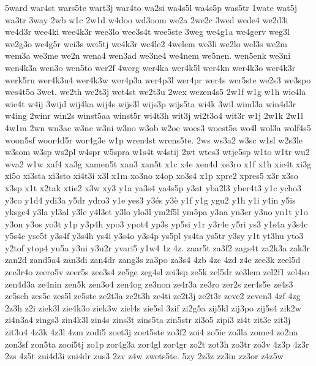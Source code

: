 {5ward
war4st
wars5te
wart3j
war4to
wa2si
wa4s5l
wa4s5p
was5tr
1wate
wat5j
wa3tr
3way
2wb
w1c
2w1d
w4doo
wd3oom
we2a
2we2c
3wed
wede4
we2d3i
we4d3r
wee4ki
wee4k3r
wee3lo
wee3s4t
wee5ste
3weg
we4g1a
we4gerv
weg3l
we2g3o
we4g5r
wei3s
wei5tj
we4k3r
we4le2
4welem
we3li
we2lo
wel3s
we2m
wem3a
we3me
we2n
wena4
wen3ad
we3ne4
we4nem
we5nen.
wen5enk
we3ni
wen4k3a
wen3o
wen5to
wer2f
4werg
wer4ka
wer4k5l
wer4kn
wer4k3o
wer4k3r
werk5ru
wer4k3u4
wer4k3w
wer4p3a
wer4p3l
wer4pr
wer4s
wer5ste
we2s3
we3spo
wes4t5o
3wet.
we2th
we2t3j
wet4st
we2t3u
2wex
wezen4s5
2w1f
w1g
w1h
wie4la
wie4t
w4ij
3wijd
wij4ka
wij4s
wijs3l
wijs3p
wijs5ta
wi4k
3wil
wind3a
win4d3r
w4ing
2winr
win2s
winst5aa
winst5r
wi4t3h
wit3j
wi2t3o4
wit3r
w1j
2w1k
2w1l
4w1m
2wn
wn3ac
w3ne
w3ni
w3no
w3ob
w2oe
woes3
woest5a
wo4l
wol3a
wolf4s5
woon5sf
woor4d5r
wor4g3e
w1p
wren4st
wrens5te.
2ws
ws3a2
w3sc
w1sl
w2s3le
w3som
w3sp
ws2pl
w4spr
w5spra
w1s4t
w4stij
2wt
wtes3
wtje5sp
w1to
w1tr
wu2
wva2
w1w
xaf4
xa3g
xamen5t
xan3
xan5t
x1c
x4e
xen4d
xe3ro
x1f
x1h
xie4t
xi3g
xi5o
xi3sta
xi3sto
xi4t3i
x3l
x1m
xo3no
x4op
xo3s4
x1p
xpre2
xpres5
x3r
x3so
x3sp
x1t
x2tak
xtie2
x3w
xy3
y1a
ya3s4
ya4s5p
y3at
yba2l3
yber4t3
y1c
ycho3
y3co
y1d4
ydi3a
y5dr
ydro3
y1e
yes3
y3és
y3è
y1f
y1g
ygu2
y1h
y1i
y4in
y5is
yksge4
y3la
yl3al
y3le
y4l3et
y3lo
ylo3l
ym2f5l
ym5pa
y3na
yn3er
y3no
yn1t
y1o
y3on
y3os
yo3t
y1p
y3p4h
ypo3
ypot4
yp3s
yp5si
y1r
y3r4e
y5ri
ys3
y1s4a
y3s4c
y5s4e
yse5t
y3s4f
y3s4h
ys4i
y3s4o
y3s4p
ys5pl
ys4ta
ys5tr
y3sy
y1t
yt3hu
yto3
y2tof
ytop4
yu5a
y3ui
y3u2r
yvari5
y1w4
1z
4z.
zaar5t
za3f2
zags4t
za2k3a
zak3r
zan2d
zand5a4
zan3di
zan4dr
zang3s
za3po
za3s4
4zb
4zc
4zd
z4e
zee3k
zeel5d
zee3r4o
zeero5v
zeer5s
zee3s4
ze5ge
zeg4sl
zei3sp
ze5k
zel5dr
ze3lem
zel2f1
zel4so
zen4d3a
ze4nin
zen5k
zen3o4
zen4og
ze3non
ze4r3a
ze3ro
zer2s
zer4s5e
ze4s3
ze5sch
zes5e
zes5l
ze5ste
ze2t3a
ze2t3h
ze4ti
ze2t3j
ze2t3r
zeve2
zeven3
4zf
4zg
2z3h
z2i
ziek3l
zie4k3o
ziek3w
ziel4s
zie5sl
3zif
zi2g5a
zij5kl
zij3po
zij5s4
zik2w
zi4n3a4
zings3
zin4k3l
zin4s
zins3t
zins5ta
zin5str
zi3o5
zipi3
zi4t
zit3e
zit3j
zit3u4
4z3k
4z3l
4zm
zodi5
zoet3j
zoet5ste
zo3f2
zoi4
zo5ie
zo3la
zome4
zo2na
zon3sf
zon5ta
zooi5tj
zo1p
zor4g3a
zor4gl
zor4gr
zo2t
zot3h
zo3tr
zo3v
4z3p
4z3r
2zs
4z5t
zui4d3i
zui4dr
zus3
2zv
z4w
zwets5te.
5zy
2z3z
zz3in
zz3or
z4z5w
}
